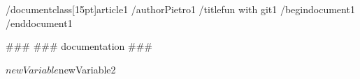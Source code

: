 /documentclass[15pt]{article1}
/author{Pietro1}
/title{fun with git1}
/begin{document1}
/end{document1}

###
### documentation
###



$newVariable
$newVariable2
